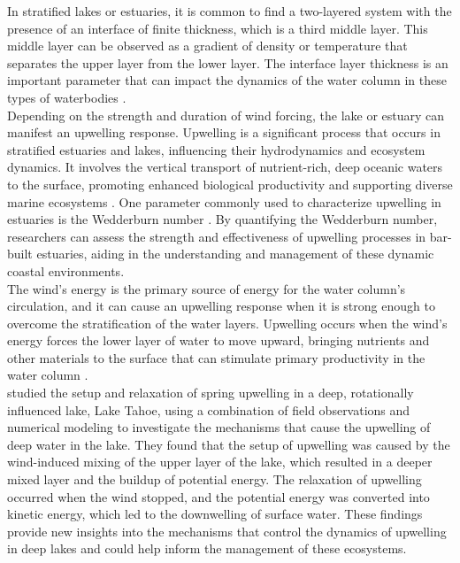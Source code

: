 \documentclass[tesis.tex]{subfiles}
\begin{document}
In stratified lakes or estuaries, it is common to find a two-layered system with the presence of an interface of finite thickness, which is a third middle layer. This middle layer can be observed as a gradient of density or temperature that separates the upper layer from the lower layer. The interface layer thickness is an important parameter that can impact the dynamics of the water column in these types of waterbodies \citep{simpson1974fronts}.\\

Depending on the strength and duration of wind forcing, the lake or estuary can manifest an upwelling response. Upwelling is a significant process that occurs in stratified estuaries and lakes, influencing their hydrodynamics and ecosystem dynamics. It involves the vertical transport of nutrient-rich, deep oceanic waters to the surface, promoting enhanced biological productivity and supporting diverse marine ecosystems \citep{gupta2022nutrient}. One parameter commonly used to characterize upwelling in estuaries is the Wedderburn number \citep{Imberger1982}. By quantifying the Wedderburn number, researchers can assess the strength and effectiveness of upwelling processes in bar-built estuaries, aiding in the understanding and management of these dynamic coastal environments.\\

The wind's energy is the primary source of energy for the water column's circulation, and it can cause an upwelling response when it is strong enough to overcome the stratification of the water layers. Upwelling occurs when the wind's energy forces the lower layer of water to move upward, bringing nutrients and other materials to the surface that can stimulate primary productivity in the water column \citep{macintyre2010ecosystem}. \\

\cite{roberts2021setup} studied the setup and relaxation of spring upwelling in a deep, rotationally influenced lake, Lake Tahoe, using a combination of field observations and numerical modeling to investigate the mechanisms that cause the upwelling of deep water in the lake. They found that the setup of upwelling was caused by the wind-induced mixing of the upper layer of the lake, which resulted in a deeper mixed layer and the buildup of potential energy. The relaxation of upwelling occurred when the wind stopped, and the potential energy was converted into kinetic energy, which led to the downwelling of surface water. These findings provide new insights into the mechanisms that control the dynamics of upwelling in deep lakes and could help inform the management of these ecosystems.\\
\end{document}

